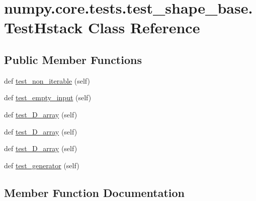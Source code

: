 \hypertarget{classnumpy_1_1core_1_1tests_1_1test__shape__base_1_1TestHstack}{}\section{numpy.\+core.\+tests.\+test\+\_\+shape\+\_\+base.\+Test\+Hstack Class Reference}
\label{classnumpy_1_1core_1_1tests_1_1test__shape__base_1_1TestHstack}
\subsection*{Public Member Functions}
\begin{DoxyCompactItemize}
\item 
def \hyperlink{classnumpy_1_1core_1_1tests_1_1test__shape__base_1_1TestHstack_a07ddfbaba89cd372bee2a6cd571b8ecf}{test\+\_\+non\+\_\+iterable} (self)
\item 
def \hyperlink{classnumpy_1_1core_1_1tests_1_1test__shape__base_1_1TestHstack_a55227db45e89c84bd673dd49a91ce97b}{test\+\_\+empty\+\_\+input} (self)
\item 
def \hyperlink{classnumpy_1_1core_1_1tests_1_1test__shape__base_1_1TestHstack_a2725f666f7158e9a3238aaf982859041}{test\+\_\+D\+\_\+array} (self)
\item 
def \hyperlink{classnumpy_1_1core_1_1tests_1_1test__shape__base_1_1TestHstack_a4bb13b0d35687a7756155d9848a81a75}{test\+\_\+D\+\_\+array} (self)
\item 
def \hyperlink{classnumpy_1_1core_1_1tests_1_1test__shape__base_1_1TestHstack_aa504cc285eb106228f0f8141b0b7a0d8}{test\+\_\+D\+\_\+array} (self)
\item 
def \hyperlink{classnumpy_1_1core_1_1tests_1_1test__shape__base_1_1TestHstack_a50db7256babd20f6642fa6b3acf65fa1}{test\+\_\+generator} (self)
\end{DoxyCompactItemize}


\subsection{Member Function Documentation}
\mbox{\label{classnumpy_1_1core_1_1tests_1_1test__shape__base_1_1TestHstack_a2725f666f7158e9a3238aaf982859041}} 
